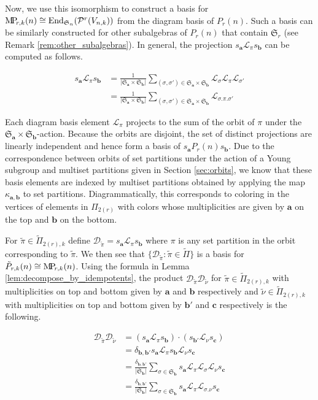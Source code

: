 \documentclass[ALCO,Unicode,published]{cedram}
\newcommand{\DD}{\mathcal{D}}
\newcommand{\LL}{\mathcal{L}}
\newcommand{\PP}{\mathcal{P}}
\newcommand{\SG}{\mathfrak{S}}
\newcommand{\bfa}{{\boldsymbol{a}}}
\newcommand{\bfb}{{\boldsymbol{b}}}
\newcommand{\bfc}{{\boldsymbol{c}}}
\newcommand{\MP}{{\rm M\!P\!}}
\newcommand{\tpi}{{\tilde{\pi}}}
\newcommand{\tnu}{{\tilde{\nu}}}
\newcommand{\abs}[1]{\left| #1\right |}
\DeclareMathOperator{\End}{End}
\begin{document}
Now, we use this isomorphism to construct a basis for $\MP_{r,k}(n)\cong\End_{\SG_n}(\PP^r(V_{n,k}))$ from the diagram basis of $P_r(n)$. Such a basis can be similarly constructed for other subalgebras of $P_r(n)$ that contain $\SG_r$ (see Remark \ref{rem:other_subalgebras}). In general, the projection $s_\bfa \LL_\pi s_\bfb$ can be computed as follows.

\begin{align*}
    s_\bfa\LL_\pi s_\bfb&=\frac{1}{\abs{\SG_\bfa\times\SG_\bfb}}\sum_{(\sigma,\sigma')\in \SG_\bfa\times\SG_\bfb} \LL_\sigma\LL_\pi\LL_{\sigma'}\\
    &=\frac{1}{\abs{\SG_\bfa\times\SG_\bfb}}\sum_{(\sigma,\sigma')\in \SG_\bfa\times\SG_\bfb} \LL_{\sigma.\pi.\sigma'}
\end{align*}

Each diagram basis element $\LL_\pi$ projects to the sum of the orbit of $\pi$ under the $\SG_\bfa\times\SG_{\bfb}$-action. Because the orbits are disjoint, the set of distinct projections are linearly independent and hence form a basis of $s_\bfa P_r(n) s_\bfb$. Due to the correspondence between orbits of set partitions under the action of a Young subgroup and multiset partitions given in Section \ref{sec:orbits}, we know that these basis elements are indexed by multiset partitions obtained by applying the map $\kappa_{\bfa,\bfb}$ to set partitions. Diagrammatically, this corresponds to coloring in the vertices of elements in $\Pi_{2(r)}$ with colors whose multiplicities are given by $\bfa$ on the top and $\bfb$ on the bottom.

For $\tpi\in\tilde\Pi_{2(r),k}$ define $\DD_\tpi=s_\bfa\LL_\pi s_\bfb$ where $\pi$ is any set partition in the orbit corresponding to $\tpi$. We then see that $\{\DD_\tpi:\tpi\in\tilde\Pi\}$ is a basis for $\tilde{P}_{r,k}(n)\cong \MP_{r,k}(n)$. Using the formula in Lemma \ref{lem:decompose_by_idempotents}, the product $\DD_\tpi\DD_\tnu$ for $\tpi\in\tilde\Pi_{2(r),k}$ with multiplicities on top and bottom given by $\bfa$ and $\bfb$ respectively and $\tnu\in\tilde\Pi_{2(r),k}$ with multiplicities on top and bottom given by $\bfb'$ and $\bfc$ respectively is the following.

\begin{align*}
    \DD_\tpi\DD_\tnu&=(s_\bfa\LL_\pi s_\bfb)\cdot(s_{\bfb'}\LL_\nu s_\bfc)\\
    &=\delta_{\bfb,\bfb'}s_\bfa\LL_\pi s_\bfb \LL_\nu s_\bfc\\
    &=\frac{\delta_{\bfb,\bfb'}}{\abs{\SG_\bfb}}\sum_{\sigma\in\SG_\bfb}s_\bfa\LL_\pi\LL_\sigma\LL_\nu s_\bfc\\
    &=\frac{\delta_{\bfb,\bfb'}}{\abs{\SG_\bfb}}\sum_{\sigma\in\SG_\bfb}s_\bfa\LL_\pi\LL_{
    \sigma.\nu} s_\bfc
\end{align*}
\end{document}
